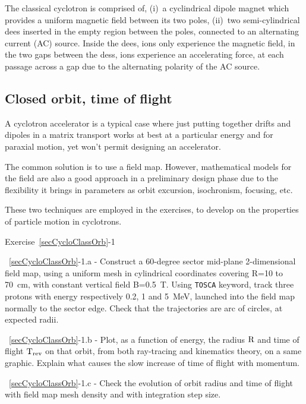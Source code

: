 The classical cyclotron  is comprised of, (i)~a cyclindrical dipole magnet which provides a uniform 
 magnetic field between its two poles, (ii)~two semi-cylindrical dees inserted 
in the empty region between the  poles, connected to an alternating current (AC) source. 
Inside the dees, ions only experience the magnetic field, in the two gaps between the dess, ions 
experience an accelerating force, at each passage across a gap due to the alternating polarity of the AC source.



\subsection{Closed orbit, time of flight \label{secCycloClassOrb}}

A cyclotron accelerator is a typical case 
where just putting together drifts and dipoles in a matrix transport works at best 
at a particular energy and for paraxial motion, yet won't permit designing an accelerator. 

The common solution is to use a field map. However, mathematical models for the field 
are also a good approach in a preliminary design phase due to the flexibility it brings 
in parameters as orbit excursion, isochronism, focusing, etc.

These two techniques are employed  in the exercises, to develop on the properties of particle motion 
in cyclotrons. 

\smallskip
\noindent {\small $\bullet$} Exercise~\ref{secCycloClassOrb}-1 

\noindent ~\ref{secCycloClassOrb}-1.a - 
Construct a 60-degree sector mid-plane 2-dimensional field map, 
using a uniform mesh in cylindrical coordinates  covering R=10 to 70~cm, 
with constant vertical field B=0.5~T.
Using \texttt{TOSCA} keyword, track three protons with energy respectively 0.2, 1 and 5~MeV,
launched  into the field map normally to the sector edge. 
Check that the trajectories are arc of circles, at expected radii. 

\noindent ~\ref{secCycloClassOrb}-1.b - 
 Plot, as a function of energy, the 
  radius $\rm R$ and  time of flight $\rm T_{\rm rev}$ on that orbit, 
 from both ray-tracing and kinematics theory, on a same graphic. 
Explain what causes the slow increase of time of flight with momentum. 

\noindent ~\ref{secCycloClassOrb}-1.c - 
Check the evolution of orbit radius and time of flight  with field map mesh density and with 
integration step size.




